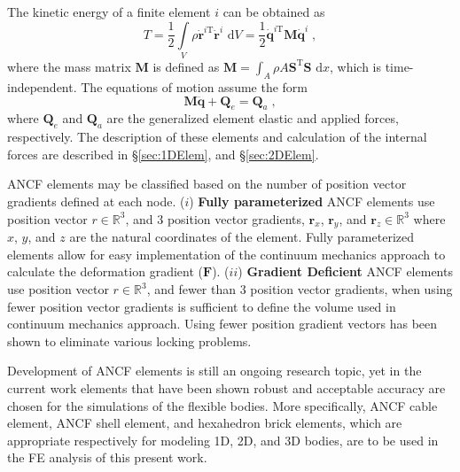The kinetic energy of a finite element $i$ can be obtained as
\begin{equation} \label{eq:ANCF_T}
T = \frac{1}{2}\int\limits_V {\rho {{{\mathbf{\dot r}}}^{i\text{T}}}{\mathbf{\dot r}}^{i}} {\text{ d}}V = \frac{1}{2}{{\mathbf{\dot q}}^{i\text{T}}}{\mathbf{M\dot q}^{i}}\;,
\end{equation}
where the mass matrix ${\mathbf{M}}$ is defined as \small ${\mathbf{M}} = \int_A {\rho A {{\bm{S}}^\text{T}}{\bm{S}}} {\text{ d}}x$, which is time-independent. The equations of motion assume the form \cite{shabana2013} 
\begin{equation}
\mathbf{M} \ddot{\mathbf{q}} + \mathbf{{Q}}_e=\mathbf{{Q}}_a\;,
\end{equation}
where  $\mathbf{{Q}}_e$ and $\mathbf{{Q}}_a$ are the generalized element elastic and applied forces, respectively. The description of these elements and calculation of the internal forces are described in \S \ref{sec:1DElem}, and \S \ref{sec:2DElem}.

ANCF elements may be classified based on the number of position vector gradients defined at each node. ($i$) \textbf{Fully parameterized} ANCF elements use position vector $r \in \mathbb R^3$, and 3 position vector gradients, $\bm{r}_x$, $\bm{r}_y$, and $ \bm{r}_z  \in \mathbb R^3 $ where $x$, $y$, and $z$ are the natural coordinates of the element. Fully parameterized elements allow for easy implementation of the continuum mechanics approach to calculate the deformation gradient ($\textbf{F}$). ($ii$) \textbf{Gradient Deficient} ANCF elements use position vector $r \in \mathbb R^3$, and fewer than 3 position vector gradients, when using fewer position vector gradients is sufficient to define the volume used in continuum mechanics approach. Using fewer position gradient vectors has been shown to eliminate various locking problems.

Development of ANCF elements is still an ongoing research topic, yet in the current work elements that have been shown robust and acceptable accuracy are chosen for the simulations of the flexible bodies. More specifically, ANCF cable element, ANCF shell element, and hexahedron brick elements, which are appropriate respectively for modeling 1D, 2D, and 3D bodies, are to be used in the FE analysis of this present work.


